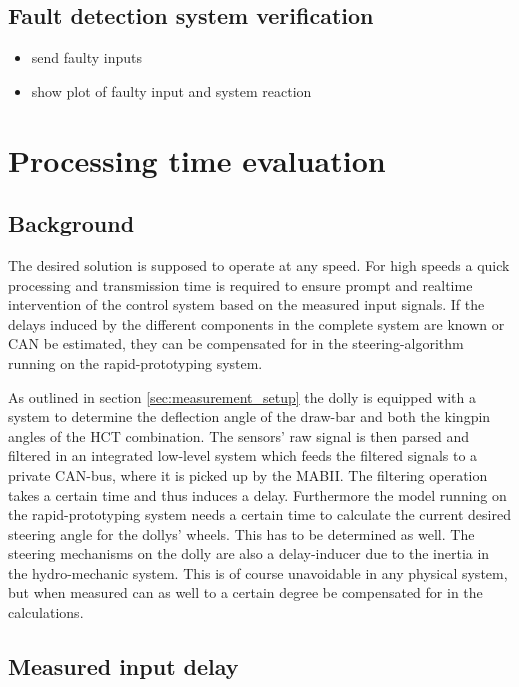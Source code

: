\documentclass[ExampleMasters.tex]{subfiles}
\begin{document}
\subsection{Fault detection system verification}
\label{sec:fault_detect_test}

\begin{itemize}
	\item send faulty inputs
	\item show plot of faulty input and system reaction
	
\end{itemize}
\section{Processing time evaluation}
\label{chap:processing_time_delay}
\subsection{Background}
The desired solution is supposed to operate at any speed. For high speeds a quick processing and transmission time is required to ensure prompt and realtime intervention of the control system based on the measured input signals. If the delays induced by the different components in the complete system are known or \gls{CAN} be estimated, they can be compensated for in the steering-algorithm running on the rapid-prototyping system.

As outlined in section \ref{sec:measurement_setup} the dolly is equipped with a system to determine the deflection angle of the draw-bar and both the kingpin angles of the \gls{HCT} combination. The sensors' raw signal is then parsed and filtered in an integrated low-level system which feeds the filtered signals to a private \gls{CAN}-bus, where it is picked up by the \gls{MABII}. The filtering operation takes a certain time and thus induces a delay. Furthermore the model running on the rapid-prototyping system needs a certain time to calculate the current desired steering angle for the dollys' wheels. This has to be determined as well. The steering mechanisms on the dolly are also a delay-inducer due to the inertia in the hydro-mechanic system. This is of course unavoidable in any physical system, but when measured can as well to a certain degree be compensated for in the calculations. 


\subsection{Measured input delay}
\label{sec:measuring_delay}
\end{document}
